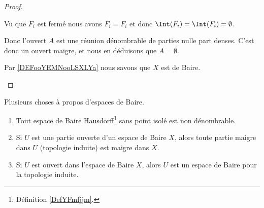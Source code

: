 \begin{proof}
\begin{subproof}
\begin{subproof}
			Vu que \( F_i\) est fermé nous avons \( \bar F_i=F_i\) et donc \( \Int(\bar F_i)=\Int(F_i)=\emptyset\).
		\end{subproof}
		Donc l'ouvert \( A\) est une réunion dénombrable de parties nulle part denses. C'est donc un ouvert maigre, et nous en déduisons que \( A=\emptyset\).

		Par \ref{DEFooYEMNooLSXLYa} nous savons que \( X\) est de Baire.
	\end{subproof}
\end{proof}

\begin{proposition}	\label{PROPooGVTDooRMaEUK}
	Plusieurs choses à propos d'espaces de Baire.
	\begin{enumerate}
		\item		\label{ITEMooYZKYooEvcLTx}
		      Tout espace de Baire Hausdorff\footnote{Définition \ref{DefYFmfjjm}.} sans point isolé est non dénombrable.
		\item		\label{ITEMooBZCAooIYQpvO}
		      Si \( U\) est une partie ouverte d'un espace de Baire \( X\), alors toute partie maigre dans \( U\) (topologie induite) est maigre dans \( X\).
		\item		\label{ITEMooGHMTooDYUicn}
		      Si \( U\) est ouvert dans l'espace de Baire \( X\), alors \( U\) est un espace de Baire pour la topologie induite.
	\end{enumerate}
\end{proposition}

